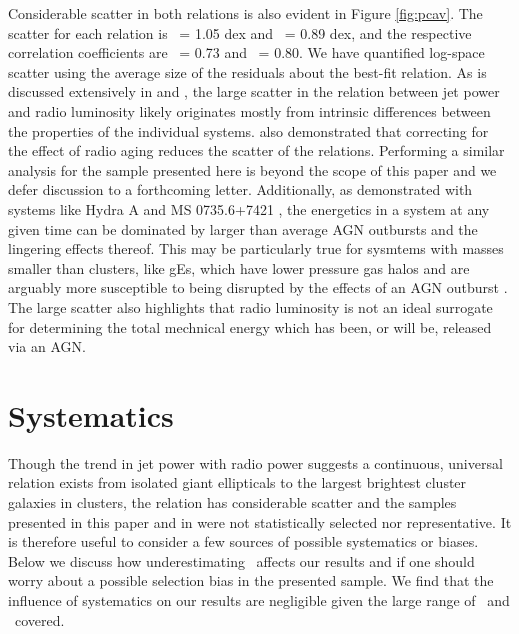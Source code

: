 \documentclass{emulateapj}
\begin{document}
Considerable scatter in both relations is also evident in Figure
\ref{fig:pcav}. The scatter for each relation is \shigh\ = 1.05 dex
and \slow\ = 0.89 dex, and the respective correlation coefficients are
\rhigh\ = 0.73 and \rlow\ = 0.80. We have quantified log-space scatter
using the average size of the residuals about the best-fit
relation. As is discussed extensively in \citet{birzan04} and
\citet{birzan08}, the large scatter in the relation between jet power
and radio luminosity likely originates mostly from intrinsic
differences between the properties of the individual
systems. \citet{birzan08} also demonstrated that correcting for the
effect of radio aging reduces the scatter of the relations. Performing
a similar analysis for the sample presented here is beyond the scope
of this paper and we defer discussion to a forthcoming
letter. Additionally, as demonstrated with systems like Hydra A
\citep{hydraa} and MS 0735.6+7421 \citep{ms0735}, the energetics in a
system at any given time can be dominated by larger than average AGN
outbursts and the lingering effects thereof. This may be particularly
true for sysmtems with masses smaller than clusters, like gEs, which
have lower pressure gas halos and are arguably more susceptible to
being disrupted by the effects of an AGN outburst \citep{minggroups}.
The large scatter also highlights that radio luminosity is not an
ideal surrogate for determining the total mechnical energy which has
been, or will be, released via an AGN.

\section{Systematics}
\label{sec:sys}

Though the trend in jet power with radio power suggests a continuous,
universal relation exists from isolated giant ellipticals to the
largest brightest cluster galaxies in clusters, the relation has
considerable scatter and the samples presented in this paper and in
\citet{birzan04} were not statistically selected nor
representative. It is therefore useful to consider a few sources of
possible systematics or biases. Below we discuss how underestimating
\pcav\ affects our results and if one should worry about a possible
selection bias in the presented sample. We find that the influence of
systematics on our results are negligible given the large range of
\pcav\ and \prad\ covered.
\end{document}
